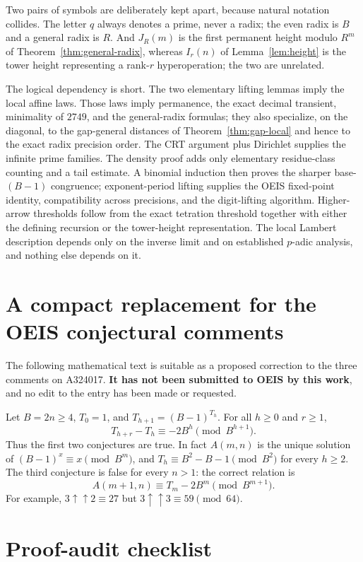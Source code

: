 \documentclass[11pt,letterpaper]{article}
\numberwithin{equation}{section}
\theoremstyle{definition}
\theoremstyle{remark}
\newcommand{\panel}[1]{\noindent\colorbox{pale}{\parbox{0.95\textwidth}{\small #1}}}
\begin{document}
Two pairs of symbols are deliberately kept apart, because natural notation collides. The letter $q$ always denotes a prime, never a radix; the even radix is $B$ and a general radix is $R$. And $J_R(m)$ is the first permanent height modulo $R^m$ of Theorem~\ref{thm:general-radix}, whereas $I_r(n)$ of Lemma~\ref{lem:height} is the tower height representing a rank-$r$ hyperoperation; the two are unrelated.

The logical dependency is short. The two elementary lifting lemmas imply the local affine laws. Those laws imply permanence, the exact decimal transient, minimality of $2749$, and the general-radix formulas; they also specialize, on the diagonal, to the gap-general distances of Theorem~\ref{thm:gap-local} and hence to the exact radix precision order. The CRT argument plus Dirichlet supplies the infinite prime families. The density proof adds only elementary residue-class counting and a tail estimate. A binomial induction then proves the sharper base-$(B-1)$ congruence; exponent-period lifting supplies the OEIS fixed-point identity, compatibility across precisions, and the digit-lifting algorithm. Higher-arrow thresholds follow from the exact tetration threshold together with either the defining recursion or the tower-height representation. The local Lambert description depends only on the inverse limit and on established $p$-adic analysis, and nothing else depends on it.

\clearpage
\section{A compact replacement for the OEIS conjectural comments}\label{app:oeis-text}

The following mathematical text is suitable as a proposed correction to the three comments on A324017. \textbf{It has not been submitted to OEIS by this work}, and no edit to the entry has been made or requested.

\panel{%
Let $B=2n\ge4$, $T_0=1$, and $T_{h+1}=(B-1)^{T_h}$. For all $h\ge0$ and $r\ge1$,
\[
 T_{h+r}-T_h\equiv-2B^h\pmod{B^{h+1}} .
\]
Thus the first two conjectures are true. In fact $A(m,n)$ is the unique solution of $(B-1)^x\equiv x\pmod{B^m}$, and $T_h\equiv B^2-B-1\pmod{B^2}$ for every $h\ge2$. The third conjecture is false for every $n>1$: the correct relation is
\[
 A(m+1,n)\equiv T_m-2B^m\pmod{B^{m+1}} .
\]
For example, $3\uparrow\uparrow2\equiv27$ but $3\uparrow\uparrow3\equiv59\pmod{64}$.}

\section{Proof-audit checklist}\label{app:checklist}
\end{document}
